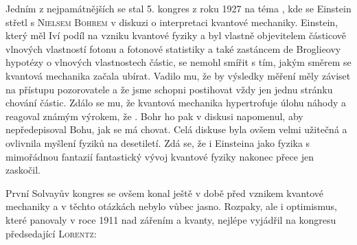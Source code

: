 
        Jedním z nejpamátnějších se stal 5. kongres z roku 1927 na téma \emph{}, kde se Einstein střetl s \textsc{Nielsem Bohrem} v diskuzi o interpretaci kvantové
        mechaniky. Einstein, který měl Iví podíl na vzniku kvantové fyziky a byl vlastně objevitelem
        částicově vlnových vlastností fotonu a fotonové statistiky a také zastáncem de Broglieovy
        hypotézy o vlnových vlastnostech částic, se nemohl smířit s tím, jakým směrem se kvantová
        mechanika začala ubírat. Vadilo mu, že by výsledky měření měly záviset na přístupu
        pozorovatele a že jsme schopni postihovat vždy jen jednu stránku chování částic. Zdálo se
        mu, že kvantová mechanika hypertrofuje úlohu náhody a reagoval známým výrokem, že
        \emph{}. Bohr ho pak v diskusi napomenul, aby nepředepisoval
        Bohu, jak se má chovat. Celá diskuse byla ovšem velmi užitečná a ovlivnila myšlení fyziků na
        desetiletí. Zdá se, že i Einsteina jako fyzika s mimořádnou fantazií fantastický vývoj
        kvantové fyziky nakonec přece jen zaskočil.

        První Solvayův kongres se ovšem konal ještě v době před vznikem kvantové mechaniky a v
        těchto otázkách nebylo vůbec jasno. Rozpaky, ale i optimismus, které panovaly v roce 1911
        nad zářením a kvanty, nejlépe vyjádřil na kongresu předsedající \textsc{Lorentz}:
        \emph{}

